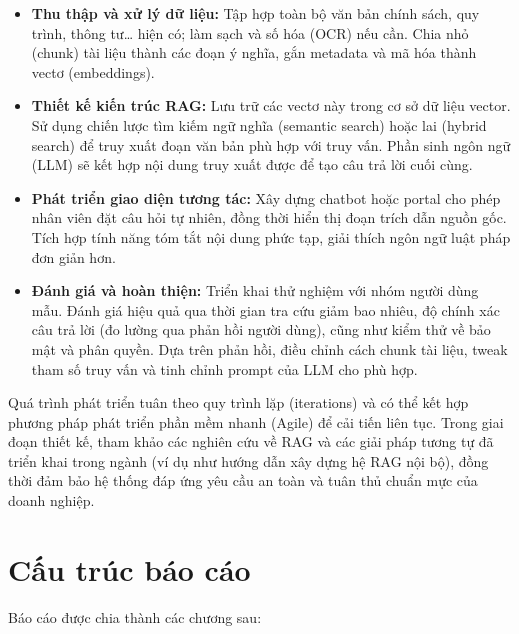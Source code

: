 \documentclass[12pt,a4paper]{report}
\begin{document}
\begin{itemize}
    \item \textbf{Thu thập và xử lý dữ liệu:} Tập hợp toàn bộ văn bản chính sách, quy trình, thông tư… hiện có; làm sạch và số hóa (OCR) nếu cần. Chia nhỏ (chunk) tài liệu thành các đoạn ý nghĩa, gắn metadata và mã hóa thành vectơ (embeddings).
    \item \textbf{Thiết kế kiến trúc RAG:} Lưu trữ các vectơ này trong cơ sở dữ liệu vector. Sử dụng chiến lược tìm kiếm ngữ nghĩa (semantic search) hoặc lai (hybrid search) để truy xuất đoạn văn bản phù hợp với truy vấn. Phần sinh ngôn ngữ (LLM) sẽ kết hợp nội dung truy xuất được để tạo câu trả lời cuối cùng.
    \item \textbf{Phát triển giao diện tương tác:} Xây dựng chatbot hoặc portal cho phép nhân viên đặt câu hỏi tự nhiên, đồng thời hiển thị đoạn trích dẫn nguồn gốc. Tích hợp tính năng tóm tắt nội dung phức tạp, giải thích ngôn ngữ luật pháp đơn giản hơn.
    \item \textbf{Đánh giá và hoàn thiện:} Triển khai thử nghiệm với nhóm người dùng mẫu. Đánh giá hiệu quả qua thời gian tra cứu giảm bao nhiêu, độ chính xác câu trả lời (đo lường qua phản hồi người dùng), cũng như kiểm thử về bảo mật và phân quyền. Dựa trên phản hồi, điều chỉnh cách chunk tài liệu, tweak tham số truy vấn và tinh chỉnh prompt của LLM cho phù hợp.
\end{itemize}

Quá trình phát triển tuân theo quy trình lặp (iterations) và có thể kết hợp phương pháp phát triển phần mềm nhanh (Agile) để cải tiến liên tục. Trong giai đoạn thiết kế, tham khảo các nghiên cứu về RAG và các giải pháp tương tự đã triển khai trong ngành (ví dụ như hướng dẫn xây dựng hệ RAG nội bộ), đồng thời đảm bảo hệ thống đáp ứng yêu cầu an toàn và tuân thủ chuẩn mực của doanh nghiệp.

\section{Cấu trúc báo cáo}
Báo cáo được chia thành các chương sau:
\end{document}

